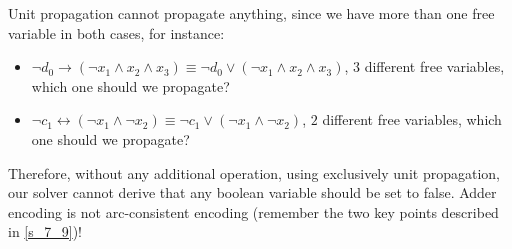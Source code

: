 Unit propagation cannot propagate anything, since we have more than one free variable in both cases, for instance:
\begin{itemize}
    \renewcommand{\labelitemi}{-}
    \item $\neg d_0 \rightarrow (\neg x_1 \wedge x_2 \wedge x_3) \equiv \neg d_0 \vee (\neg x_1 \wedge x_2 \wedge x_3)$, $3$ different free variables, which one should we propagate?
    \item $\neg c_1 \leftrightarrow (\neg x_1 \wedge \neg x_2) \equiv \neg c_1 \vee (\neg x_1 \wedge \neg x_2)$, $2$ different free variables, which one should we propagate?
\end{itemize}
Therefore, without any additional operation, using exclusively unit propagation, our solver cannot derive that any boolean variable should be set to false. 
Adder encoding is not arc-consistent encoding (remember the two key points described in \ref{s_7_9})!